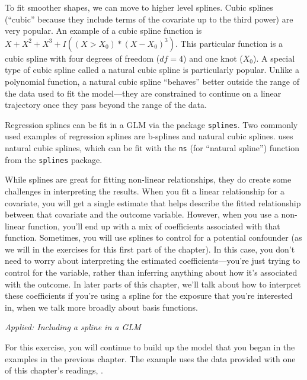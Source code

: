 \documentclass[
]{book}
\begin{document}
To fit smoother shapes, we can move to higher level splines. Cubic splines
(``cubic'' because they include terms of the covariate up to the third power) are
very popular.
An example of a cubic spline
function is \(X+X^{2}+X^{3}+I((X>X_{0})*(X-X_{0})^3)\). This particular function is
a cubic spline with four degrees of freedom (\(df=4\)) and one knot (\(X_{0}\)).
A special type of cubic spline called a natural cubic spline is particularly popular.
Unlike a polynomial function, a natural cubic spline ``behaves'' better outside
the range of the data used to fit the model---they are constrained to continue
on a linear trajectory once they pass beyond the range of the data.

Regression splines can be fit in a GLM via the package \texttt{splines}. Two commonly
used examples of regression splines are b-splines and natural cubic
splines. \citet{vicedo2019hands} uses natural cubic splines, which can be fit with the
\texttt{ns} (for ``natural spline'') function from the \texttt{splines} package.

While splines are great for fitting non-linear relationships, they do create some
challenges in interpreting the results. When you fit a linear relationship for
a covariate, you will get a single estimate that helps describe the fitted relationship
between that covariate and the outcome variable. However, when you use a non-linear
function, you'll end up with a mix of coefficients associated with that function.
Sometimes, you will use splines to control for a potential confounder (as we
will in the exercises for this first part of the chapter). In this case, you don't
need to worry about interpreting the estimated coefficients---you're just trying to
control for the variable, rather than inferring anything about how it's associated
with the outcome.
In later parts of this chapter, we'll talk about how to interpret these coefficients
if you're using a spline for the exposure that you're interested in, when we talk
more broadly about basis functions.

\emph{Applied: Including a spline in a GLM}

For this exercise, you will continue to build up the model that you began in
the examples in the previous chapter. The example uses the data provided with
one of this chapter's readings, \citet{vicedo2019hands}.
\end{document}

